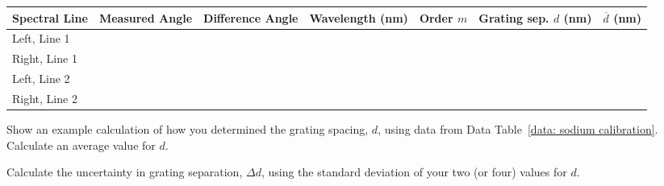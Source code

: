 \documentclass[addpoints]{physlabs}
\begin{document}
\begin{postlab}
    \begin{center}
        \renewcommand{\arraystretch}{2}
        \captionsetup{font=normalsize}
        \begin{tabular}{|l|>{\centering\arraybackslash}p{1.8cm}|>{\centering\arraybackslash}p{1.8cm}|>{\centering\arraybackslash}p{1.8cm}|>{\centering\arraybackslash}p{1.8cm}|>{\centering\arraybackslash}p{2cm}|>{\centering\arraybackslash}p{2cm}|}
        \hline
        \rowcolor{gray!20}
        Spectral Line & Measured Angle & Difference Angle & Wavelength (nm) & Order $m$ & Grating sep. $d$ (nm) & $\overline{d}$ (nm)    \\
        \hline
        Left, Line 1  &                &                  &                 &           &                             & \multirow{4}{*}{} \\
        \cline{1-6}
        Right, Line 1 &                &                  &                 &           &                             &                   \\
        \cline{1-6}
        Left, Line 2  &                &                  &                 &           &                             &                   \\
        \cline{1-6}
        Right, Line 2 &                &                  &                 &           &                             &             
        \\
        \hline
        \end{tabular}
    \end{center}

    \filbreak
    \question[1] Show an example calculation of how you determined the grating spacing, $d$, using data from Data Table~\ref{data: sodium calibration}. Calculate an average value for $d$.
    \begin{solution}[3cm]
        
    \end{solution}

    \filbreak
    \question[1] Calculate the uncertainty in grating separation, $\Delta d$, using the standard deviation of your two (or four) values for $d$.
    \begin{solution}[2cm]
        
    \end{solution}



\end{postlab}
\end{document}
